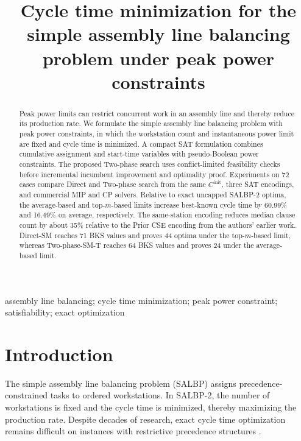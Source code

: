 \documentclass[]{interact}
\theoremstyle{plain}
\theoremstyle{definition}
\theoremstyle{remark}
\begin{document}

\title{Cycle time minimization for the simple assembly line balancing problem under peak power constraints}

\author{
}

\maketitle
\enlargethispage{6pt}

\begin{abstract}
Peak power limits can restrict concurrent work in an assembly line and thereby reduce its production rate. We formulate the simple assembly line balancing problem with peak power constraints, in which the workstation count and instantaneous power limit are fixed and cycle time is minimized. A compact SAT formulation combines cumulative assignment and start-time variables with pseudo-Boolean power constraints. The proposed Two-phase search uses conflict-limited feasibility checks before incremental incumbent improvement and optimality proof. Experiments on 72 cases compare Direct and Two-phase search from the same $C^{\mathrm{init}}$, three SAT encodings, and commercial MIP and CP solvers. Relative to exact uncapped SALBP-2 optima, the average-based and top-$m$-based limits increase best-known cycle time by 60.99\% and 16.49\% on average, respectively. The same-station encoding reduces median clause count by about 35\% relative to the Prior CSE encoding from the authors' earlier work. Direct-SM reaches 71 BKS values and proves 44 optima under the top-$m$-based limit, whereas Two-phase-SM-T reaches 64 BKS values and proves 24 under the average-based limit.
\end{abstract}

\begin{keywords}
assembly line balancing; cycle time minimization; peak power constraint; satisfiability; exact optimization
\end{keywords}

\section{Introduction}

The simple assembly line balancing problem (SALBP) assigns precedence-constrained tasks to ordered workstations. In SALBP-2, the number of workstations is fixed and the cycle time is minimized, thereby maximizing the production rate. Despite decades of research, exact cycle time optimization remains difficult on instances with restrictive precedence structures \citep{Scholl2006,Li2021Enhanced,Alvarez2024BBR}.
\end{document}
